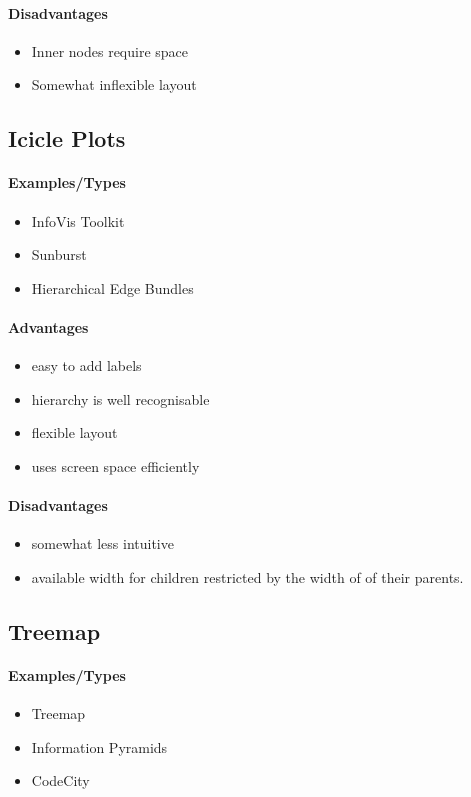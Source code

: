 \documentclass[10pt,a4paper]{article}
\begin{document}
		\paragraph{Disadvantages}
		\begin{itemize}
			\item Inner nodes require space
			\item Somewhat inflexible layout
		\end{itemize}
	
	\subsection{Icicle Plots}
	\paragraph{Examples/Types}
	\begin{itemize}
		\item InfoVis Toolkit
		\item Sunburst
		\item Hierarchical Edge Bundles
	\end{itemize}
	\paragraph{Advantages}
	\begin{itemize}
		\item easy to add labels
		\item hierarchy is well	recognisable
		\item flexible layout
		\item uses screen space efficiently
	\end{itemize}
	\paragraph{Disadvantages}
	\begin{itemize}
		\item somewhat less intuitive
		\item available width for children restricted by the width of of their parents.
	\end{itemize}

	\subsection{Treemap}
	\paragraph{Examples/Types}
	\begin{itemize}
		\item Treemap
		\item Information Pyramids
		\item CodeCity
	\end{itemize}
\end{document}
